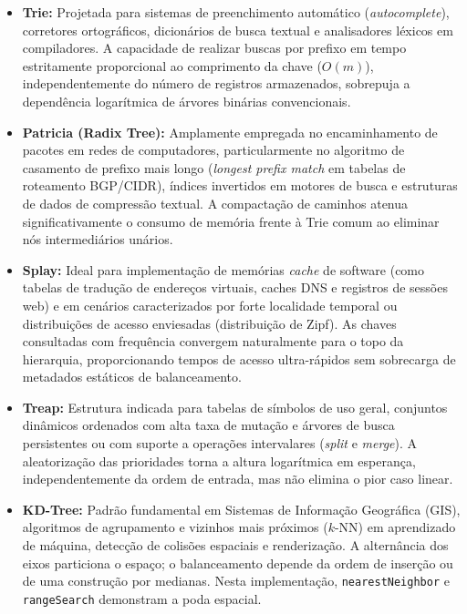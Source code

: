 \documentclass[11pt, a4paper]{article}
\begin{document}
\begin{itemize}
    \item \textbf{Trie:} Projetada para sistemas de preenchimento automático (\textit{autocomplete}), corretores ortográficos, dicionários de busca textual e analisadores léxicos em compiladores. A capacidade de realizar buscas por prefixo em tempo estritamente proporcional ao comprimento da chave ($O(m)$), independentemente do número de registros armazenados, sobrepuja a dependência logarítmica de árvores binárias convencionais.
    \item \textbf{Patricia (Radix Tree):} Amplamente empregada no encaminhamento de pacotes em redes de computadores, particularmente no algoritmo de casamento de prefixo mais longo (\textit{longest prefix match} em tabelas de roteamento BGP/CIDR), índices invertidos em motores de busca e estruturas de dados de compressão textual. A compactação de caminhos atenua significativamente o consumo de memória frente à Trie comum ao eliminar nós intermediários unários.
    \item \textbf{Splay:} Ideal para implementação de memórias \textit{cache} de software (como tabelas de tradução de endereços virtuais, caches DNS e registros de sessões web) e em cenários caracterizados por forte localidade temporal ou distribuições de acesso enviesadas (distribuição de Zipf). As chaves consultadas com frequência convergem naturalmente para o topo da hierarquia, proporcionando tempos de acesso ultra-rápidos sem sobrecarga de metadados estáticos de balanceamento.
    \item \textbf{Treap:} Estrutura indicada para tabelas de símbolos de uso geral, conjuntos dinâmicos ordenados com alta taxa de mutação e árvores de busca persistentes ou com suporte a operações intervalares (\textit{split} e \textit{merge}). A aleatorização das prioridades torna a altura logarítmica em esperança, independentemente da ordem de entrada, mas não elimina o pior caso linear.
    \item \textbf{KD-Tree:} Padrão fundamental em Sistemas de Informação Geográfica (GIS), algoritmos de agrupamento e vizinhos mais próximos ($k$-NN) em aprendizado de máquina, detecção de colisões espaciais e renderização. A alternância dos eixos particiona o espaço; o balanceamento depende da ordem de inserção ou de uma construção por medianas. Nesta implementação, \texttt{nearestNeighbor} e \texttt{rangeSearch} demonstram a poda espacial.
\end{itemize}
\end{document}
